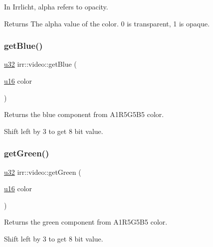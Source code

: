 In Irrlicht, alpha refers to opacity. \begin{DoxyReturn}{Returns}
The alpha value of the color. 0 is transparent, 1 is opaque. 
\end{DoxyReturn}
\mbox{\label{namespaceirr_1_1video_ae8dc9edd5a3eb01de47933ac2d7f679e}} 
\subsubsection{\texorpdfstring{get\+Blue()}{getBlue()}}
{\footnotesize\ttfamily \hyperlink{namespaceirr_a0416a53257075833e7002efd0a18e804}{u32} irr\+::video\+::get\+Blue (\begin{DoxyParamCaption}\item[{\hyperlink{namespaceirr_ae9f8ec82692ad3b83c21f555bfa70bcc}{u16}}]{color }\end{DoxyParamCaption})\hspace{0.3cm}{\ttfamily [inline]}}



Returns the blue component from A1\+R5\+G5\+B5 color. 

Shift left by 3 to get 8 bit value. \mbox{\label{namespaceirr_1_1video_a3e64185c36326ed33a494ba14cac00a5}} 
\subsubsection{\texorpdfstring{get\+Green()}{getGreen()}}
{\footnotesize\ttfamily \hyperlink{namespaceirr_a0416a53257075833e7002efd0a18e804}{u32} irr\+::video\+::get\+Green (\begin{DoxyParamCaption}\item[{\hyperlink{namespaceirr_ae9f8ec82692ad3b83c21f555bfa70bcc}{u16}}]{color }\end{DoxyParamCaption})\hspace{0.3cm}{\ttfamily [inline]}}



Returns the green component from A1\+R5\+G5\+B5 color. 

Shift left by 3 to get 8 bit value. \mbox{\label{namespaceirr_1_1video_aa98234702c65c82ce29115b12e89dafe}} 
